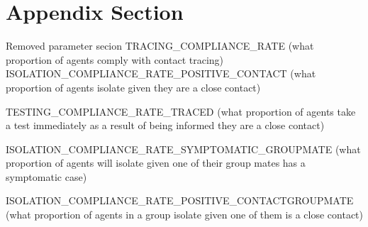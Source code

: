 \documentclass{article}
\begin{document}
\appendix

\section{Appendix Section}

Removed parameter secion
TRACING\_COMPLIANCE\_RATE (what proportion of agents comply with contact tracing)
ISOLATION\_COMPLIANCE\_RATE\_POSITIVE\_CONTACT (what proportion of agents isolate given they are a close contact)

TESTING\_COMPLIANCE\_RATE\_TRACED (what proportion of agents take a test immediately as a result of being informed they are a close contact)


\item ISOLATION\_COMPLIANCE\_RATE\_SYMPTOMATIC\_GROUPMATE (what proportion of agents will isolate given one of their group mates has a symptomatic case)

\item ISOLATION\_COMPLIANCE\_RATE\_POSITIVE\_CONTACTGROUPMATE (what proportion of agents in a group isolate given one of them is a close contact)
\end{document}
